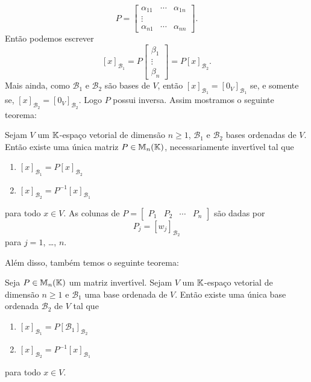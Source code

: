 \[
	P = \begin{bmatrix}
		\alpha_{11} & \cdots & \alpha_{1n}\\
		\vdots\\
		\alpha_{n1} & \cdots & \alpha_{nn}
	\end{bmatrix}.
\]
Ent\~ao podemos escrever
\[
	[x]_{\mathcal{B}_1} = P \begin{bmatrix}
		\beta_1\\ 
		\vdots\\
		\beta_n
	\end{bmatrix} = P[x]_{\mathcal{B}_2}.
\]
Mais ainda, como $\mathcal{B}_1$ e $\mathcal{B}_2$ s\~ao bases de $V$, ent\~ao $[x]_{\mathcal{B}_1} = [0_V]_{\mathcal{B}_1}$ se, e somente se, $[x]_{\mathcal{B}_2} = [0_V]_{\mathcal{B}_2}$. Logo $P$ possui inversa. Assim mostramos o seguinte teorema:

\begin{teorema}\label{teorema_mudanca_base}
	Sejam $V$ um $\mathbb{K}$-espa\c{c}o vetorial de dimens\~ao $n \ge 1$, $\mathcal{B}_1$ e $\mathcal{B}_2$ bases ordenadas de $V$. Ent\~ao existe uma \'unica matriz $P \in \mathbb{M}_n(\mathbb{K})$, necessariamente invert{\'\i}vel tal que
	\begin{enumerate}
		\item $[x]_{\mathcal{B}_1} = P[x]_{\mathcal{B}_2}$
		\item $[x]_{\mathcal{B}_2} = P^{-1}[x]_{\mathcal{B}_1}$
	\end{enumerate}
	para todo $x \in V$. As colunas de $P = \begin{bmatrix}
		P_1 & P_2 & \cdots & P_n
	\end{bmatrix}$ s\~ao dadas por
	\[
		P_j = [w_j]_{\mathcal{B}_2}
	\]
	para $j = 1$, \dots, $n$.
\end{teorema}

Al\'em disso, tamb\'em temos o seguinte teorema:

\begin{teorema}\label{teorema_matriz_mudanca_base}
	Seja $P \in \mathbb{M}_n(\mathbb{K})$ um matriz invert{\'\i}vel. Sejam $V$ um $\mathbb{K}$-espa\c{c}o vetorial de dimens\~ao $n \ge 1$ e $\mathcal{B}_1$ uma base ordenada de $V$. Ent\~ao existe uma \'unica base ordenada $\mathcal{B}_2$ de $V$ tal que
	\begin{enumerate}
		\item $[x]_{\mathcal{B}_1} = P[\mathcal{B}_1]_{\mathcal{B}_2}$
		\item $[x]_{\mathcal{B}_2} = P^{-1}[x]_{\mathcal{B}_1}$
	\end{enumerate}
	para todo $x \in V$.
\end{teorema}

